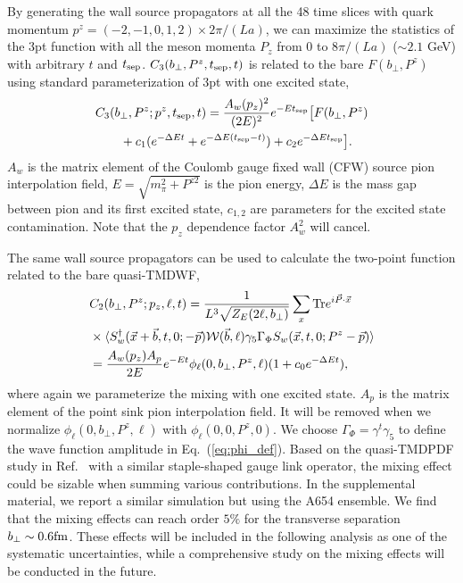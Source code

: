 By generating the wall source propagators at all the 48 time slices with quark momentum ${p}^z=(-2,-1,0,1,2) \times 2\pi/(La)$, we can maximize the statistics of the 3pt function with all the meson momenta $P_z$ from 0 to $8\pi/(La)$ ($\sim 2.1$ GeV) with arbitrary $t$ and $t_{\rm sep}$.  $C_3(b_\perp,P^z,t_{\rm sep},t)$ is related to the bare $F(b_\perp,P^z)$ using standard parameterization of 3pt with one excited {state},
\begin{align}
& C_3(b_\perp,P^z;p^z,t_{\rm sep},t)=\frac{A_w(p_z)^2}{(2E)^2}e^{-Et_{\rm sep}}\big[F(b_\perp,P^z)\nonumber\\
&\quad\quad+c_1(e^{-\Delta E t}+e^{-\Delta E (t_{\rm sep}-t)})+c_2e^{-\Delta E t_{\rm sep}}\big].
 \label{eq:3pt}
\end{align}
$A_w$ is the matrix element of the Coulomb gauge fixed wall (CFW) source pion interpolation field, $E=\sqrt{m_{\pi}^2+{P}^{z2}}$ is the pion energy, $\Delta E$ is the mass gap between pion and its first excited state, $c_{1,2} $ are parameters for the excited state contamination. Note that the $p_z$ dependence factor $A_w^2$ will cancel{.}

The same wall source propagators can be used to calculate the two-point function related to the bare quasi-TMDWF,
\begin{align}
&C_2(b_\perp,P^z;p_z,\ell,t)=\frac{1}{L^3\sqrt{Z_E(2\ell,b_\perp)}}\sum_x \textrm{Tr}e^{i\vec{P}\cdot \vec{x}}\nonumber\\
&\times\langle  S_w^\dagger(\vec{x}+\vec{b},t,0;-\vec{p}){\cal W}(\vec b,\ell) \gamma_5\Gamma_\Phi  S_w(\vec{x},t,0;P^z-\vec{p}) \rangle\nonumber\\
& =\frac{A_w(p_z)A_p}{2E}e^{-Et}\phi_\ell(0,b_\perp,P^z,\ell)(1+c_0 e^{-\Delta E t}),\label{eq:2pt}
\end{align}
where again we parameterize the mixing with one excited state. 
$A_p$ is the matrix element of the point sink pion interpolation field. It will be  removed when we normalize $\phi_\ell(0,b_\perp,P^z,\ell)$ with $\phi_\ell(0,0,P^z,0)$. We choose $\Gamma_\Phi=\gamma^t\gamma_5$
to define the wave function amplitude in Eq.~(\ref{eq:phi_def}). Based on the quasi-TMDPDF study in Ref.{~\cite{Shanahan:2019zcq,Shanahan:2020zxr}} with a similar staple-shaped gauge link operator, the mixing effect {could be sizable  when summing various contributions. In the supplemental material, we report a similar simulation but using the A654 ensemble. We find that the mixing effects can reach   order $5\%$ for the transverse separation $b_\perp\sim 0.6{\rm fm}$. These effects will be included in the following analysis as  one of the systematic uncertainties, while a comprehensive study on the mixing effects will be conducted in the future. } 



